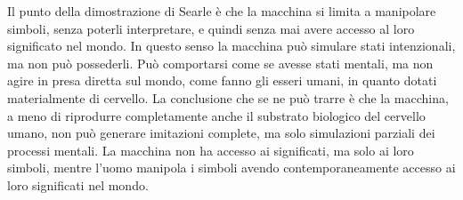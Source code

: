 Il punto della dimostrazione di Searle è che la macchina si limita a manipolare simboli, senza poterli interpretare, e quindi senza mai avere accesso al loro significato nel mondo. In questo senso la macchina può simulare stati intenzionali, ma non può possederli. Può comportarsi come se avesse stati mentali, ma non agire in presa diretta sul mondo, come fanno gli esseri umani, in quanto dotati materialmente di cervello. La conclusione che se ne può trarre è che la macchina, a meno di riprodurre completamente anche il substrato biologico del cervello umano, non può generare imitazioni complete, ma solo simulazioni parziali dei processi mentali. La macchina non ha accesso ai significati, ma solo ai loro simboli, mentre l’uomo manipola i simboli avendo contemporaneamente accesso ai loro significati nel mondo.
